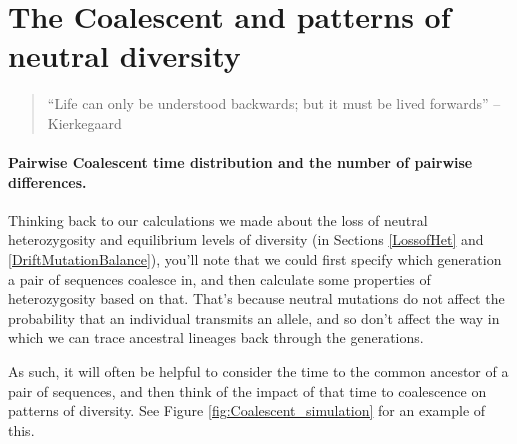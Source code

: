 \section{The Coalescent and patterns of neutral diversity}

\begin{quote}
``Life can only be understood backwards; but it must be lived
forwards'' -- Kierkegaard
\end{quote}

\paragraph{Pairwise Coalescent time distribution and the number of
 pairwise differences.}
Thinking back to our calculations we made about the loss of neutral heterozygosity
and equilibrium levels of diversity (in Sections \ref{LossofHet} and \ref{DriftMutationBalance}), you'll note that we could first specify
which generation a pair of sequences coalesce in, and then calculate
some properties of heterozygosity based on that. That's because neutral
mutations do not affect the probability that an individual transmits
an allele, and so don't affect the way in which we can trace ancestral lineages
back through the generations. \\

As such, it will often be helpful to consider the time to the common
ancestor of a pair of sequences, and then think of the impact of that time to coalescence
on patterns of diversity. See Figure \ref{fig:Coalescent_simulation}
for an example of this.

